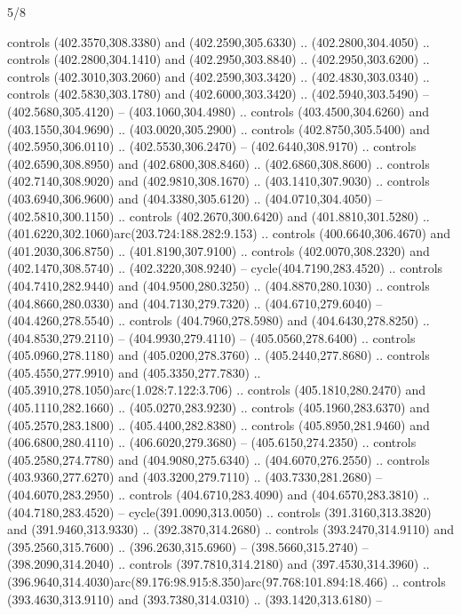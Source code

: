 \begin{flagdescription}{5/8}
\begin{scope}[xshift=0.5\flaglength,yshift=0.5\flagwidth,scale=\flagwidth/475.63]
\begin{scope}[y=0.8pt, x=0.8pt, yscale=-1, xscale=1,shift={(-450,-300)}]
\begin{scope}[cm={{1.0,0.0,0.0,1.0,(-0.0002,0.12556)}},cm={{1.0,0.0,0.0,1.0,(0.00179,0.0)}}]
\begin{scope}[fill=c00863d]
  controls (402.3570,308.3380) and (402.2590,305.6330) .. (402.2800,304.4050) ..
  controls (402.2800,304.1410) and (402.2950,303.8840) .. (402.2950,303.6200) ..
  controls (402.3010,303.2060) and (402.2590,303.3420) .. (402.4830,303.0340) ..
  controls (402.5830,303.1780) and (402.6000,303.3420) .. (402.5940,303.5490) --
  (402.5680,305.4120) -- (403.1060,304.4980) .. controls (403.4500,304.6260) and
  (403.1550,304.9690) .. (403.0020,305.2900) .. controls (402.8750,305.5400) and
  (402.5950,306.0110) .. (402.5530,306.2470) -- (402.6440,308.9170) .. controls
  (402.6590,308.8950) and (402.6800,308.8460) .. (402.6860,308.8600) .. controls
  (402.7140,308.9020) and (402.9810,308.1670) .. (403.1410,307.9030) .. controls
  (403.6940,306.9600) and (404.3380,305.6120) .. (404.0710,304.4050) --
  (402.5810,300.1150) .. controls (402.2670,300.6420) and (401.8810,301.5280) ..
  (401.6220,302.1060)arc(203.724:188.282:9.153) .. controls (400.6640,306.4670)
  and (401.2030,306.8750) .. (401.8190,307.9100) .. controls (402.0070,308.2320)
  and (402.1470,308.5740) .. (402.3220,308.9240) -- cycle(404.7190,283.4520) ..
  controls (404.7410,282.9440) and (404.9500,280.3250) .. (404.8870,280.1030) ..
  controls (404.8660,280.0330) and (404.7130,279.7320) .. (404.6710,279.6040) --
  (404.4260,278.5540) .. controls (404.7960,278.5980) and (404.6430,278.8250) ..
  (404.8530,279.2110) -- (404.9930,279.4110) -- (405.0560,278.6400) .. controls
  (405.0960,278.1180) and (405.0200,278.3760) .. (405.2440,277.8680) .. controls
  (405.4550,277.9910) and (405.3350,277.7830) ..
  (405.3910,278.1050)arc(1.028:7.122:3.706) .. controls (405.1810,280.2470) and
  (405.1110,282.1660) .. (405.0270,283.9230) .. controls (405.1960,283.6370) and
  (405.2570,283.1800) .. (405.4400,282.8380) .. controls (405.8950,281.9460) and
  (406.6800,280.4110) .. (406.6020,279.3680) -- (405.6150,274.2350) .. controls
  (405.2580,274.7780) and (404.9080,275.6340) .. (404.6070,276.2550) .. controls
  (403.9360,277.6270) and (403.3200,279.7110) .. (403.7330,281.2680) --
  (404.6070,283.2950) .. controls (404.6710,283.4090) and (404.6570,283.3810) ..
  (404.7180,283.4520) -- cycle(391.0090,313.0050) .. controls
  (391.3160,313.3820) and (391.9460,313.9330) .. (392.3870,314.2680) .. controls
  (393.2470,314.9110) and (395.2560,315.7600) .. (396.2630,315.6960) --
  (398.5660,315.2740) -- (398.2090,314.2040) .. controls (397.7810,314.2180) and
  (397.4530,314.3960) ..
  (396.9640,314.4030)arc(89.176:98.915:8.350)arc(97.768:101.894:18.466) ..
  controls (393.4630,313.9110) and (393.7380,314.0310) .. (393.1420,313.6180) --

\end{scope}
\end{scope}
\end{scope}
\end{scope}
\end{flagdescription}
